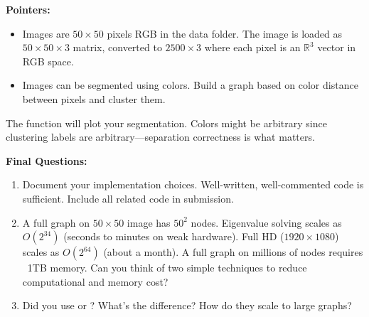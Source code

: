 \documentclass[11pt]{article}
\begin{document}
\begin{infobox}
\textbf{Pointers:}
\begin{itemize}[leftmargin=*]
    \item Images are $50 \times 50$ pixels RGB in the data folder.
        The image is loaded as $50 \times 50 \times 3$ matrix,
        converted to $2500 \times 3$ where each pixel is an $\mathbb{R}^3$
        vector in RGB space.
    \item Images can be segmented using colors. Build a graph based on
          color distance between pixels and cluster them.
\end{itemize}
\end{infobox}

The function  will plot your segmentation.
Colors might be arbitrary since clustering labels are arbitrary---separation
correctness is what matters.

\begin{questionbox}
\textbf{Final Questions:}
\begin{enumerate}[leftmargin=*]
    \item Document your implementation choices. Well-written, well-commented
        code is sufficient. Include all related code in submission.
    \item A full graph on $50 \times 50$ image has $50^2$ nodes.
        Eigenvalue solving scales as $O(2^{34})$ (seconds to minutes on weak hardware).
        Full HD ($1920 \times 1080$) scales as $O(2^{64})$ (about a month).
        A full graph on millions of nodes requires ~1TB memory.
        Can you think of two simple techniques to reduce computational and memory cost?
    \item Did you use  or ? What's the difference?
        How do they scale to large graphs?
\end{enumerate}
\end{questionbox}



\end{document}
